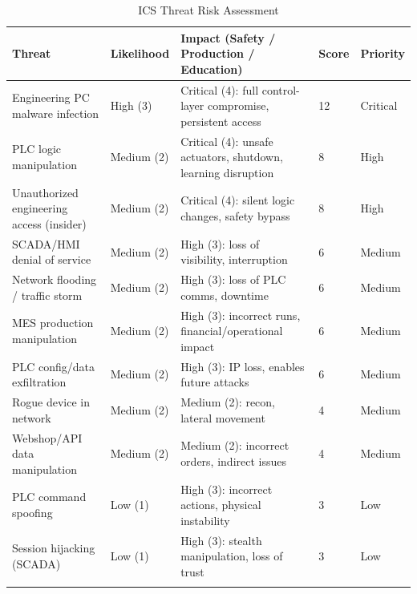 \documentclass[11pt,a4paper]{article}
\begin{document}
{\small
\setlength{\tabcolsep}{4pt}
\begin{longtable}{L{4.0cm} L{1.8cm} L{6.0cm} L{1.4cm} L{1.6cm}}
\toprule
\textbf{Threat} & \textbf{Likelihood} & \textbf{Impact (Safety / Production / Education)} & \textbf{Score} & \textbf{Priority} \\
\midrule \endhead
Engineering PC malware infection & High (3) & Critical (4): full control-layer
    compromise, persistent access & 12 & Critical \\

    PLC logic manipulation & Medium (2) & Critical (4): unsafe actuators,
    shutdown, learning disruption & 8 & High \\

    Unauthorized engineering access (insider) & Medium (2) & Critical (4):
    silent logic changes, safety bypass & 8 & High \\

    SCADA/HMI denial of service & Medium (2) & High (3): loss of visibility,
    interruption & 6 & Medium \\

    Network flooding / traffic storm & Medium (2) & High (3): loss of PLC
    comms, downtime & 6 & Medium \\

    MES production manipulation & Medium (2) & High (3): incorrect runs,
    financial/operational impact & 6 & Medium \\

    PLC config/data exfiltration & Medium (2) & High (3): IP loss, enables
    future attacks & 6 & Medium \\

    Rogue device in network & Medium (2) & Medium (2): recon, lateral movement
    & 4 & Medium \\

    Webshop/API data manipulation & Medium (2) & Medium (2): incorrect orders,
    indirect issues & 4 & Medium \\

    PLC command spoofing & Low (1) & High (3): incorrect actions, physical
    instability & 3 & Low \\

    Session hijacking (SCADA) & Low (1) & High (3): stealth manipulation, loss
    of trust & 3 & Low \\
\bottomrule
\caption{ICS Threat Risk Assessment}\\
\end{longtable}
}
\end{document}
